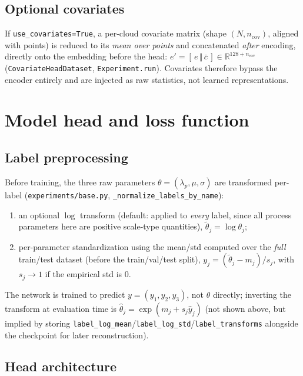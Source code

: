 \documentclass[11pt]{article}
\begin{document}
\subsection{Optional covariates}

If \texttt{use\_covariates=True}, a per-cloud covariate matrix (shape
$(N,n_\text{cov})$, aligned with points) is reduced to its \emph{mean over
points} and concatenated \emph{after} encoding, directly onto the embedding
before the head: $e' = [\,e \,\Vert\, \bar c\,] \in \mathbb
R^{128+n_\text{cov}}$ (\texttt{CovariateHeadDataset},
\texttt{Experiment.run}). Covariates therefore bypass the encoder entirely
and are injected as raw statistics, not learned representations.

\section{Model head and loss function}
\label{sec:head}

\subsection{Label preprocessing}

Before training, the three raw parameters $\theta=(\lambda_p,\mu,\sigma)$
are transformed per-label
(\texttt{experiments/base.py}, \texttt{\_normalize\_labels\_by\_name}):
\begin{enumerate}
  \item an optional $\log$ transform (default: applied to \emph{every}
    label, since all process parameters here are positive scale-type
    quantities), $\tilde\theta_j=\log\theta_j$;
  \item per-parameter standardization using the mean/std computed over the
    \emph{full} train/test dataset (before the train/val/test split),
    $y_j = (\tilde\theta_j-m_j)/s_j$, with $s_j\!\to\!1$ if the empirical std
    is $0$.
\end{enumerate}
The network is trained to predict $y=(y_1,y_2,y_3)$, not $\theta$ directly;
inverting the transform at evaluation time is $\hat\theta_j =
\exp(m_j+s_j\hat y_j)$ (not shown above, but implied by storing
\texttt{label\_log\_mean}/\texttt{label\_log\_std}/\texttt{label\_transforms}
alongside the checkpoint for later reconstruction).

\subsection{Head architecture}
\end{document}
